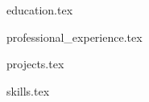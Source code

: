 \documentclass{resume} %
\begin{document}
\vspace{-0.5em}

{education.tex}

{professional_experience.tex}

{projects.tex}

{skills.tex}
\end{document}
